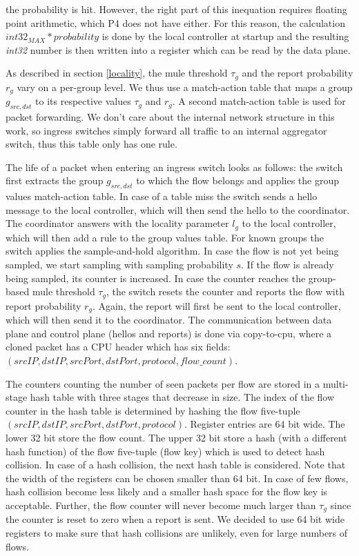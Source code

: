 \documentclass[11pt,oneside,a4paper]{article}
\begin{document}
\noindent the probability is hit. However, the right part of this inequation requires floating point arithmetic, which P4 does not have either. For this reason, the calculation $int32_{MAX} * probability$ is done by the local controller at startup and the resulting \textit{int32} number is then written into a register which can be read by the data plane.

As described in section \ref{locality}, the mule threshold $\tau_g$ and the report probability $r_g$ vary on a per-group level. We thus use a match-action table that maps a group $g_{src,dst}$ to its respective values $\tau_g$ and $r_g$. A second match-action table is used for packet forwarding. We don't care about the internal network structure in this work, so ingress switches simply forward all traffic to an internal aggregator switch, thus this table only has one rule.

The life of a packet when entering an ingress switch looks as follows: the switch first extracts the group $g_{src,dst}$ to which the flow belongs and applies the group values match-action table. In case of a table miss the switch sends a hello message to the local controller, which will then send the hello to the coordinator. The coordinator answers with the locality parameter $l_g$ to the local controller, which will then add a rule to the group values table. For known groups the switch applies the sample-and-hold algorithm. In case the flow is not yet being sampled, we start sampling with sampling probability $s$. If the flow is already being sampled, its counter is increased. In case the counter reaches the group-based mule threshold $\tau_g$, the switch resets the counter and reports the flow with report probability $r_g$. Again, the report will first be sent to the local controller, which will then send it to the coordinator. The communication between data plane and control plane (hellos and reports) is done via copy-to-cpu, where a cloned packet has a CPU header which has six fields: $(srcIP, dstIP, srcPort, dstPort, protocol, flow\_count)$.

The counters counting the number of seen packets per flow are stored in a multi-stage hash table with three stages that decrease in size. The index of the flow counter in the hash table is determined by hashing the flow five-tuple $(srcIP, dstIP, srcPort, dstPort, protocol)$. Register entries are 64 bit wide. The lower 32 bit store the flow count. The upper 32 bit store a hash (with a different hash function) of the flow five-tuple (flow key) which is used to detect hash collision. In case of a hash collision, the next hash table is considered. Note that the width of the registers can be chosen smaller than 64 bit. In case of few flows, hash collision become less likely and a smaller hash space for the flow key is acceptable. Further, the flow counter will never become much larger than $\tau_g$ since the counter is reset to zero when a report is sent. We decided to use 64 bit wide registers to make sure that hash collisions are unlikely, even for large numbers of flows.
\end{document}
